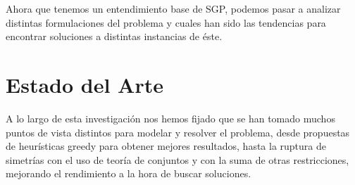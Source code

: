 \documentclass[letter, 10pt]{article}
\begin{document}
Ahora que tenemos un entendimiento base de SGP, podemos pasar a analizar distintas formulaciones del problema y cuales han sido las tendencias para encontrar soluciones a distintas instancias de éste.

\section{Estado del Arte} \label{stateart}

A lo largo de esta investigación nos hemos fijado que se han tomado muchos puntos de vista distintos para modelar y resolver el problema, desde propuestas de heurísticas greedy para obtener mejores resultados, hasta la ruptura de simetrías con el uso de teoría de conjuntos y con la suma de otras restricciones, mejorando el rendimiento a la hora de buscar soluciones.
\end{document}
